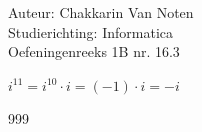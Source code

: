 \documentclass[a4paper]{article}
\begin{document}
  
\noindent \large Auteur: Chakkarin Van Noten \\
\noindent \large Studierichting: Informatica\\
\noindent \large Oefeningenreeks 1B nr. 16.3\\

\medskip

\normalsize

$i^{11} = i^{10} \cdot i = (-1) \cdot i = -i$

\begin{thebibliography}{999}
\end{thebibliography}
\end{document}
